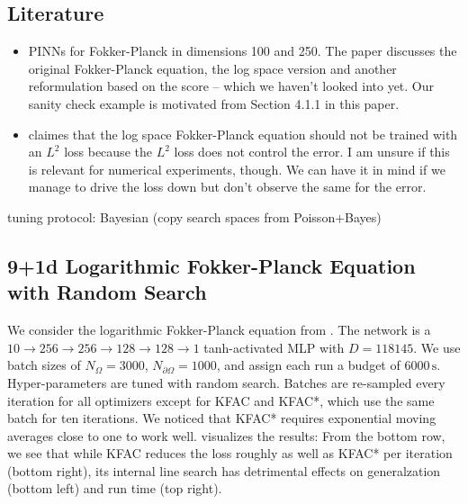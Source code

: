 \subsection{Literature}
\begin{itemize}
\item \cite{hu2024score} PINNs for Fokker-Planck in dimensions 100 and 250. The paper discusses the original Fokker-Planck equation, the log space version and another reformulation based on the score -- which we haven't looked into yet. Our sanity check example is motivated from Section 4.1.1 in this paper.
\item \cite{wang20222} claimes that the log space Fokker-Planck equation should not be trained with an $L^2$ loss because the $L^2$ loss does not control the error. I am unsure if this is relevant for numerical experiments, though. We can have it in mind if we manage to drive the loss down but don't observe the same for the error.
\end{itemize}

tuning protocol: Bayesian (copy search spaces from Poisson+Bayes)

\subsection{9+1d Logarithmic Fokker-Planck Equation with Random Search}

We consider the logarithmic Fokker-Planck equation from .
The network is a $10 \to 256 \to 256 \to 128 \to 128 \to 1$ tanh-activated MLP with $D=\num{118145}$.
We use batch sizes of $N_{\Omega} = \num{3000}$, $N_{\partial\Omega} = \num{1000}$, and assign each run a budget of $\num{6000}\,\text{s}$.
Hyper-parameters are tuned with random search.
Batches are re-sampled every iteration for all optimizers except for KFAC and KFAC*, which use the same batch for ten iterations.
We noticed that KFAC* requires exponential moving averages close to one to work well.
 visualizes the results:
From the bottom row, we see that while KFAC reduces the loss roughly as well as KFAC* per iteration (bottom right), its internal line search has detrimental effects on generalzation (bottom left) and run time (top right).

